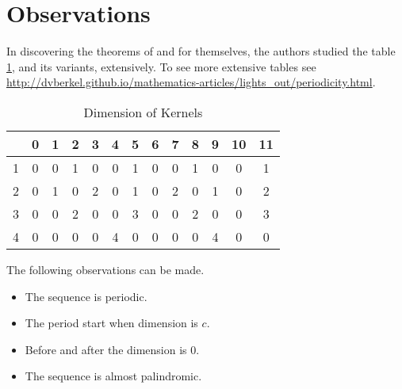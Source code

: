 \section{Observations}
In discovering the theorems of \cite{martin01} and \cite{leach17} for
themselves, the authors studied the table \ref{kernels}, and its variants,
extensively. To see more extensive tables see \url{http://dvberkel.github.io/mathematics-articles/lights_out/periodicity.html}.

\begin{table}
  \begin{center}
  \begin{tabular}{|c|cccccccccccc|}
    \hline
    & \phantom{0}0 & \phantom{0}1 & \phantom{0}2 & \phantom{0}3 & \phantom{0}4 & \phantom{0}5 & \phantom{0}6 & \phantom{0}7 & \phantom{0}8 & \phantom{0}9 & 10 & 11 \\
    \hline
    \hline
    1 & 0 & 0 & 1 & 0 & 0 & 1 & 0 & 0 & 1 & 0 & 0 & 1 \\
    2 & 0 & 1 & 0 & 2 & 0 & 1 & 0 & 2 & 0 & 1 & 0 & 2 \\
    3 & 0 & 0 & 2 & 0 & 0 & 3 & 0 & 0 & 2 & 0 & 0 & 3 \\
    4 & 0 & 0 & 0 & 0 & 4 & 0 & 0 & 0 & 0 & 4 & 0 & 0 \\
    \hline
  \end{tabular}
  \end{center}
  \caption{Dimension of Kernels}\label{kernels}
\end{table}

The following observations can be made.

\begin{itemize}
\item The sequence is periodic.
\item The period start when dimension is $c$.
\item Before and after the dimension is $0$.
\item The sequence is almost palindromic.
\end{itemize}


